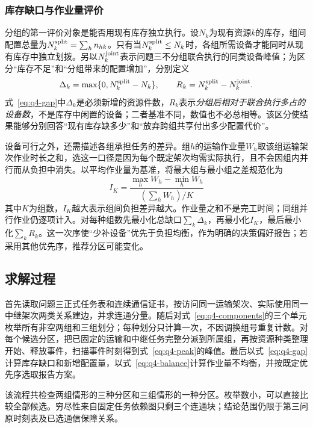 \subsubsection{库存缺口与作业量评价}
分组的第一评价对象是能否用现有库存独立执行。设$N_k$为现有资源$k$的库存，组间配置总量为$N_k^{\rm split}=\sum_h n_{hk}$。只有当$N_k^{\rm split}\le N_k$时，各组所需设备才能同时从现有库存中独立划拨。另以$N_k^{\rm joint}$表示问题三不分组联合执行的同类设备峰值；为区分“库存不足”和“分组带来的配置增加”，分别定义
\begin{equation}
\Delta_k=\max\{0,N_k^{\rm split}-N_k\},\qquad
R_k=N_k^{\rm split}-N_k^{\rm joint}.
\label{eq:q4-gap}
\end{equation}
式~\eqref{eq:q4-gap}中$\Delta_k$是必须新增的资源件数，$R_k$表示\emph{分组后相对于联合执行多占的设备数}，不是库存中闲置的设备；二者基准不同，数值也不必总相等。该区分使结果能够分别回答“现有库存缺多少”和“放弃跨组共享付出多少配置代价”。

设备可行之外，还需描述各组承担任务的差异。组$h$的运输作业量$W_h$取该组运输架次作业时长之和，选这一口径是因为每个既定架次均需实际执行，且不会因组内并行而从负担中消失。以平均作业量为基准，将最大组与最小组之差规范化为
\begin{equation}
I_K=\frac{\max_h W_h-\min_h W_h}{(\sum_h W_h)/K}
\label{eq:q4-balance}
\end{equation}
其中$K$为组数，$I_K$越大表示组间负担差异越大。作业量之和不是完工时间；同组并行作业仍逐项计入。对每种组数先最小化总缺口$\sum_k\Delta_k$，再最小化$I_K$，最后最小化$\sum_kR_k$。这一次序使“少补设备”优先于负担均衡，作为明确的决策偏好报告；若采用其他优先序，推荐分区可能变化。

\subsection{求解过程}
首先读取问题三正式任务表和连续通信证书，按访问同一运输架次、实际使用同一中继架次两类关系建边，并求连通分量。随后对式~\eqref{eq:q4-components}的三个单元枚举所有非空两组和三组划分；每种划分只计算一次，不因调换组号重复计数。对每个候选分区，把已固定的运输和中继任务完整分派到所属组，再按资源种类整理开始、释放事件，扫描事件时刻得到式~\eqref{eq:q4-peak}的峰值。最后以式~\eqref{eq:q4-gap}计算库存缺口和新增配置量，以式~\eqref{eq:q4-balance}计算作业量不均衡，并按既定优先序选取报告方案。

该流程共检查两组情形的三种分区和三组情形的一种分区。枚举数小，可以直接比较全部候选。穷尽性来自固定任务依赖图只剩三个连通块；结论范围仍限于第三问原时刻表及已选通信保障关系。

